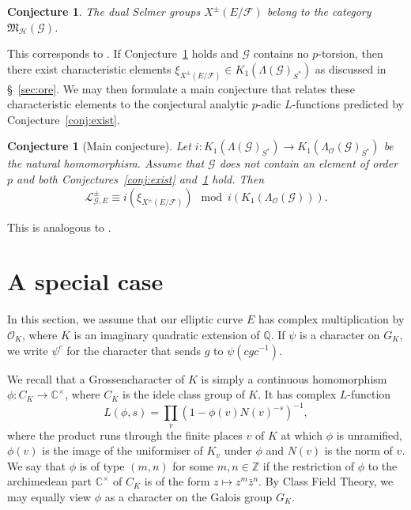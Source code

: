 \documentclass{amsart}
\newtheorem{conjecture}[theorem]{Conjecture}
\begin{document}
\begin{conjecture}\label{con:belong}
The dual Selmer groups $X^\pm(E/{\mathcal{F}})$ belong to the category ${\mathfrak{M}_{\mathcal{H}}({\mathcal{G}})}$.
\end{conjecture}

This corresponds to \cite[Conjecture~5.1]{CKFVS}. If Conjecture~\ref{con:belong} holds and ${\mathcal{G}}$ contains no $p$-torsion, then there exist characteristic elements $\xi_{X^\pm(E/{\mathcal{F}})}\in K_1(\Lambda({\mathcal{G}})_{S^*})$ as discussed in \S~\ref{sec:ore}. We may then formulate a main conjecture that relates these characteristic elements to the conjectural analytic $p$-adic $L$-functions predicted by Conjecture~\ref{conj:exist}.

\begin{conjecture}[Main conjecture]\label{conj:main}
Let $i:K_1(\Lambda({\mathcal{G}})_{S^*})\rightarrow K_1(\Lambda_{\mathcal{O}}({\mathcal{G}})_{S^*})$ be the natural homomorphism. Assume that ${\mathcal{G}}$ does not contain an element of order $p$ and both Conjectures~\ref{conj:exist} and~\ref{con:belong} hold. Then 
\[
{\mathcal{L}}_{{\mathcal{G}},E}^\pm\equiv i(\xi_{X^\pm(E/{\mathcal{F}})})\mod i(K_1(\Lambda_{\mathcal{O}}({\mathcal{G}}))).
\]
\end{conjecture}
This is analogous to \cite[Conjecture~5.8]{CKFVS}.

\section{A special case}\label{sec:special}

In this section, we assume that our elliptic curve $E$ has complex multiplication by ${\mathcal{O}}_K$, where $K$ is an imaginary quadratic extension of ${\mathbb Q}$. If $\psi$ is a character on $G_K$, we write $\psi^c$ for the character that sends $g$ to $\psi(cgc^{-1})$.

We recall that a Grossencharacter of $K$ is simply a continuous homomorphism $\phi:C_K\rightarrow{\mathbb C}^\times$, where $C_K$ is the idele class group of $K$. It has complex $L$-function
\[
L(\phi,s)=\prod_v(1-\phi(v)N(v)^{-s})^{-1},
\]
where the product runs through the finite places $v$ of $K$ at which $\phi$ is unramified, $\phi(v)$ is the image of the uniformiser of $K_{v}$ under $\phi$ and $N(v)$ is the norm of $v$. We say that $\phi$ is of type $(m,n)$ for some $m,n\in{\mathbb Z}$ if the restriction of $\phi$ to the archimedean part ${\mathbb C}^\times$ of $C_K$ is of the form $z\mapsto z^m\bar{z}^n$. By Class Field Theory, we may equally view $\phi$ as a character on the Galois group $G_K$.
\end{document}
